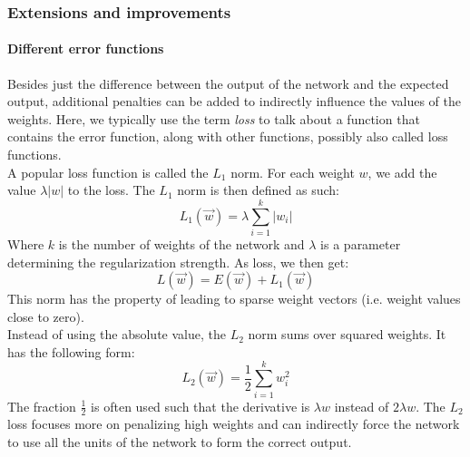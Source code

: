 \subsubsection{Extensions and improvements} %
\label{ssub:extensions_and_improvements}
\paragraph{Different error functions} %
\label{par:different_error_functions}
Besides just the difference between the output of the network and the expected output, additional penalties can be added to indirectly influence the values of the weights.
Here, we typically use the term \textit{loss} to talk about a function that contains the error function, along with other functions, possibly also called loss functions.\\

A popular loss function is called the $L_1$ norm. For each weight $w$, we add the value $\lambda \vert w \vert$ to the loss. The $L_1$ norm is then defined as such:
\begin{equation}
    L_1(\overrightarrow{w}) = \lambda \sum_{i=1}^k \vert w_i \vert
\end{equation}
Where $k$ is the number of weights of the network and $\lambda$ is a parameter determining the regularization strength.
As loss, we then get:
\begin{equation}
    L(\overrightarrow{w}) = E(\overrightarrow{w}) + L_1(\overrightarrow{w})
\end{equation}
This norm has the property of leading to sparse weight vectors (i.e. weight values close to zero). \\

Instead of using the absolute value, the $L_2$ norm sums over squared weights. It has the following form:
\begin{equation}
    L_2(\overrightarrow{w}) = \frac{1}{2} \sum_{i=1}^k w_i^2
\end{equation}
The fraction $\frac{1}{2}$ is often used such that the derivative is $\lambda w$ instead of $2 \lambda w$. The $L_2$ loss focuses more on penalizing high weights and can indirectly force the network to use all the units of the network to form the correct output.


